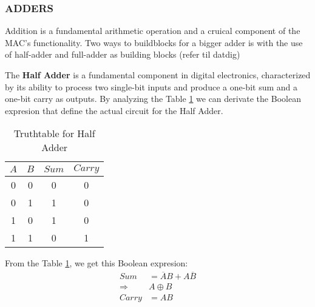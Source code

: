 
\subsubsection{ADDERS}
Addition is a fundamental arithmetic operation and a cruical component of the MAC's functionality. Two ways to buildblocks for a bigger adder is with the use of half-adder and full-adder as building blocks (refer til datdig)


The \textbf{Half Adder} is a fundamental component in digital electronics, characterized by its ability to process two single-bit inputs and produce a one-bit sum and a one-bit carry as outputs. By analyzing the Table \ref{Truthtable for Half Adder} we can derivate the Boolean expresion that define the actual circuit for the Half Adder.


\begin{table}[H]
    \centering
    \caption{Truthtable for Half Adder}\label{Truthtable for Half Adder}                 
    \begin{tabular}{|c|c|c|c|}
        \hline
        \(A\) & \(B\) & \(Sum\) & \(Carry\) \\
        \hline
        0 & 0 & 0 & 0 \\
        0 & 1 & 1 & 0 \\
        1 & 0 & 1 & 0 \\
        1 & 1 & 0 & 1 \\
        \hline
        
    \end{tabular}
\end{table}

From the Table \ref{Truthtable for Half Adder},  we get this Boolean expresion:
\begin{equation}
    \begin{aligned}
        Sum&=\overline{A}B+A\overline{B}\\
        \Rightarrow&A\oplus B\\
        Carry&=AB\\ 
    \end{aligned}
\end{equation}





